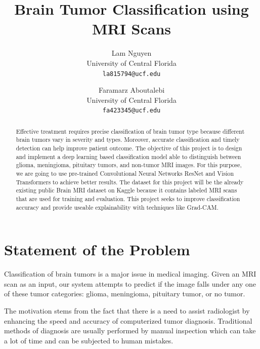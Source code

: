 \documentclass[10pt,twocolumn,letterpaper]{article}
\begin{document}
\raggedbottom  %

\title{Brain Tumor Classification using MRI Scans}

\author{Lam Nguyen\\
University of Central Florida\\
{\tt\small la815794@ucf.edu}
\and
Faramarz Aboutalebi\\
University of Central Florida\\
{\tt\small fa423345@ucf.edu}
}

\maketitle
\ificcvfinal\thispagestyle{empty}\fi

\begin{abstract}
Effective treatment requires precise classification of brain tumor type because different brain tumors vary in severity and types. Moreover, accurate classification and timely detection can help improve patient outcome. The objective of this project is to design and implement a deep learning based classification model able to distinguish between glioma, meningioma, pituitary tumors, and non-tumor MRI images. For this purpose, we are going to use pre-trained Convolutional Neural Networks ResNet and Vision Transformers to achieve better results. The dataset for this project will be the already existing public Brain MRI dataset on Kaggle because it contains labeled MRI scans that are used for training and evaluation. This project seeks to improve classification accuracy and provide useable explainability with techniques like Grad-CAM.
\end{abstract}

\section{Statement of the Problem}
Classification of brain tumors is a major issue in medical imaging. Given an MRI scan as an input, our system attempts to predict if the image falls under any one of these tumor categories: glioma, meningioma, pituitary tumor, or no tumor.

The motivation stems from the fact that there is a need to assist radiologist by enhancing the speed and accuracy of computerized tumor diagnosis. Traditional methods of diagnosis are usually performed by manual inspection which can take a lot of time and can be subjected to human mistakes.
\end{document}
